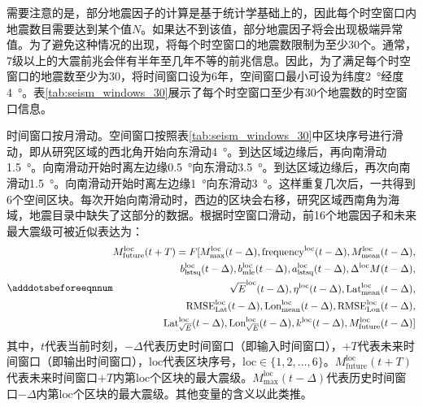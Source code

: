 需要注意的是，部分地震因子的计算是基于统计学基础上的，因此每个时空窗口内地震数目需要达到某个值$N$。如果达不到该值，部分地震因子将会出现极端异常值。为了避免这种情况的出现，将每个时空窗口的地震数限制为至少30个。通常，7级以上的大震前兆会伴有半年至几年不等的前兆信息。因此，为了满足每个时空窗口的地震数至少为30，将时间窗口设为6年，空间窗口最小可设为纬度\SI{2}{\degree}\times 经度\SI{4}{\degree}。表\ref{tab:seism_windows_30}展示了每个时空窗口至少有30个地震数的时空窗口信息。

时间窗口按月滑动。空间窗口按照表\ref{tab:seism_windows_30}中区块序号进行滑动，即从研究区域的西北角开始向东滑动\SI{4}{\degree}。到达区域边缘后，再向南滑动\SI{1.5}{\degree}。向南滑动开始时离左边缘\SI{0.5}{\degree}向东滑动\SI{3.5}{\degree}。到达区域边缘后，再次向南滑动\SI{1.5}{\degree}。向南滑动开始时离左边缘\SI{1}{\degree}向东滑动\SI{3}{\degree}。这样重复几次后，一共得到6个空间区块。每次开始向南滑动时，西边的区块会右移，研究区域西南角为海域，地震目录中缺失了这部分的数据。根据时空窗口滑动，前16个地震因子和未来最大震级可被近似表达为：
\begin{equation}\adddotsbeforeeqnnum
  \label{eq:seism_m_indicator}
  \begin{split}
    M_{\text{future}}^{\text{loc}}(t+T)=F[M_{\text{max}}^{\text{loc}}(t-\Delta ),\text{frequency}^{\text{loc}}(t-\Delta ),M_{\text{mean}}^{\text{loc}}(t-\Delta ),\\
    b_{\text{lstsq}}^{\text{loc}}(t-\Delta ),b_{\text{mle}}^{\text{loc}}(t-\Delta ),a_{\text{lstsq}}^{\text{loc}}(t-\Delta ),\Delta^{\text{loc}}M(t-\Delta ),\\
    \sqrt{E}^{\text{loc}}(t-\Delta ),\eta^{\text{loc}}(t-\Delta ),\text{Lat}_{\text{mean}}^{\text{loc}}(t-\Delta ),\\
    \text{RMSE}_{\text{Lat}}^{\text{loc}}(t-\Delta ),\text{Lon}_{\text{mean}}^{\text{loc}}(t-\Delta ),\text{RMSE}_{\text{Lon}}^{\text{loc}}(t-\Delta ),
    \\
    \text{Lat}^{\text{loc}}_{\sqrt{E}}(t-\Delta),\text{Lon}^{\text{loc}}_{\sqrt{E}}(t-\Delta ),k^{\text{loc}}(t-\Delta),M_{\text{future}}^{\text{loc}}(t-\Delta)]
  \end{split}
\end{equation}
其中，$t$代表当前时刻，$-\Delta $代表历史时间窗口（即输入时间窗口），$+T$代表未来时间窗口（即输出时间窗口），$\text{loc}$代表区块序号，$\text{loc}\in\{1,2,\ldots,6\}$。$M_{\text{future}}^{\text{loc}}(t+T)$代表未来时间窗口$+T$内第$\text{loc}$个区块的最大震级。$M_{\text{max}}^{\text{loc}}(t- \Delta )$代表历史时间窗口$- \Delta $内第$\text{loc}$个区块的最大震级。其他变量的含义以此类推。

